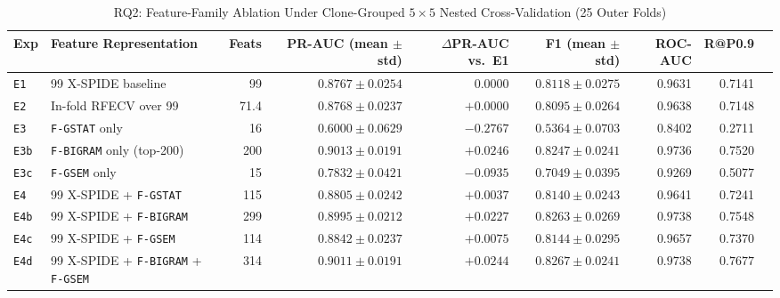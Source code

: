 \documentclass[conference]{IEEEtran}
\begin{document}
\begin{table}[t]
\centering
\caption{RQ2: Feature-Family Ablation Under Clone-Grouped $5 \times 5$ Nested Cross-Validation (25 Outer Folds)}
\label{tab:rq2_ablation}
\footnotesize
\setlength{\tabcolsep}{5pt}
\begin{tabular}{@{}llrrrrrrr@{}}
\toprule
Exp & Feature Representation & Feats & PR-AUC (mean $\pm$ std) & $\Delta$PR-AUC vs.\ E1 & F1 (mean $\pm$ std) & ROC-AUC & R@P0.9 \\
\midrule
\texttt{E1} & 99 X-SPIDE baseline & 99 & $0.8767 \pm 0.0254$ & $0.0000$ & $0.8118 \pm 0.0275$ & 0.9631 & 0.7141 \\
\texttt{E2} & In-fold RFECV over 99 & 71.4 & $0.8768 \pm 0.0237$ & $+0.0000$ & $0.8095 \pm 0.0264$ & 0.9638 & 0.7148 \\
\texttt{E3} & \texttt{F-GSTAT} only & 16 & $0.6000 \pm 0.0629$ & $-0.2767$ & $0.5364 \pm 0.0703$ & 0.8402 & 0.2711 \\
\texttt{E3b} & \texttt{F-BIGRAM} only (top-200) & 200 & $\mathbf{0.9013} \pm 0.0191$ & $+0.0246$ & $0.8247 \pm 0.0241$ & 0.9736 & 0.7520 \\
\texttt{E3c} & \texttt{F-GSEM} only & 15 & $0.7832 \pm 0.0421$ & $-0.0935$ & $0.7049 \pm 0.0395$ & 0.9269 & 0.5077 \\
\texttt{E4} & 99 X-SPIDE + \texttt{F-GSTAT} & 115 & $0.8805 \pm 0.0242$ & $+0.0037$ & $0.8140 \pm 0.0243$ & 0.9641 & 0.7241 \\
\texttt{E4b} & 99 X-SPIDE + \texttt{F-BIGRAM} & 299 & $0.8995 \pm 0.0212$ & $+0.0227$ & $0.8263 \pm 0.0269$ & $\mathbf{0.9738}$ & 0.7548 \\
\texttt{E4c} & 99 X-SPIDE + \texttt{F-GSEM} & 114 & $0.8842 \pm 0.0237$ & $+0.0075$ & $0.8144 \pm 0.0295$ & 0.9657 & 0.7370 \\
\texttt{E4d} & 99 X-SPIDE + \texttt{F-BIGRAM} + \texttt{F-GSEM} & 314 & $0.9011 \pm 0.0191$ & $+0.0244$ & $\mathbf{0.8267} \pm 0.0241$ & $\mathbf{0.9738}$ & $\mathbf{0.7677}$ \\
\bottomrule
\end{tabular}
\end{table}
\end{document}
